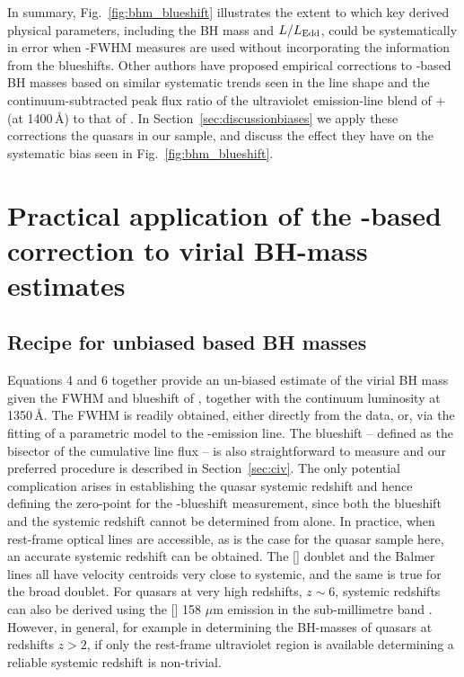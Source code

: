 In summary, Fig.~\ref{fig:bhm_blueshift} illustrates the extent to which key derived physical parameters, including the BH mass and $L/L_{\rm Edd}$, could be systematically in error when -FWHM measures are used without incorporating the information from the  blueshifts. 
Other authors have proposed empirical corrections to -based BH masses based on similar systematic trends seen in the  line shape \citep{denney12} and the continuum-subtracted peak flux ratio of the ultraviolet emission-line blend of + (at 1400\,\AA) to that of  \citep{runnoe13}.
In Section~\ref{sec:discussionbiases} we apply these corrections the quasars in our sample, and discuss the effect they have on the systematic bias seen in Fig.~\ref{fig:bhm_blueshift}. 


\section{Practical application of the -based correction to virial BH-mass estimates}

\subsection{Recipe for unbiased  based BH masses}
\label{sec:recipe}

Equations 4 and 6 together provide an un-biased estimate of the virial BH mass given the FWHM and blueshift of , together with the continuum luminosity at 1350\,\AA. 
The FWHM is readily obtained, either directly from the data, or, via the fitting of a parametric model to the -emission line. 
The blueshift -- defined as the bisector of the cumulative line flux -- is also straightforward to measure and our preferred procedure is described in Section~\ref{sec:civ}.
The only potential complication arises in establishing the quasar systemic redshift and hence defining the zero-point for the -blueshift measurement, since both the blueshift and the systemic redshift cannot be determined from  alone. 
In practice, when rest-frame optical lines are accessible, as is the case for the quasar sample here, an accurate systemic redshift can be obtained. 
The [] doublet and the Balmer lines all have velocity centroids very close to systemic, and the same is true for the broad  doublet. 
For quasars at very high redshifts, $z\sim6$, systemic redshifts can also be derived using the [] 158 $\mu$m emission in the sub-millimetre band \citep[e.g.][]{venemans16}. 
However, in general, for example in determining the BH-masses of quasars at redshifts $z>2$, if only the rest-frame ultraviolet region is available determining a reliable systemic redshift is non-trivial. 

